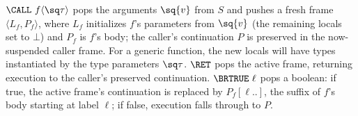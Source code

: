 $\CALL\ f\langle\sq\tau\rangle$ pops the arguments $\sq{v}$ from $S$ and pushes a fresh frame $\langle L_f, P_f\rangle$, where $L_f$ initializes $f$'s parameters from $\sq{v}$ (the remaining locals set to $\bot$) and $P_f$ is $f$'s body; the caller's continuation $P$ is preserved in the now-suspended caller frame.
For a generic function, the new locals will have types instantiated by the type parameters $\sq\tau$.
$\RET$ pops the active frame, returning execution to the caller's preserved continuation.
$\BRTRUE\ \ell$ pops a boolean: if true, the active frame's continuation is replaced by $P_f[\ell..]$, the suffix of $f$'s body starting at label $\ell$; if false, execution falls through to $P$.



